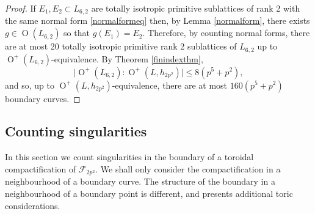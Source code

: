 \documentclass[11pt]{amsart}
\newcommand{\opn}{\operatorname}
\newcommand{\fc}{\mathcal{F}}
\begin{document}
\begin{proof}
If $E_1, E_2 \subset L_{6,2}$ are totally isotropic primitive sublattices of rank 2 with the same normal form \eqref{normalformeq} then, by Lemma \ref{normalform}, there exists $g \in \opn{O}(L_{6,2})$ so that $g(E_1) = E_2$.
Therefore, by counting normal forms, there are at most 20 totally isotropic primitive rank 2 sublattices of $L_{6,2}$ up to $\opn{O}^+(L_{6,2})$-equivalence. 
By Theorem \ref{finindexthm},  
\begin{equation*}
 \vert \opn{O}^+(L_{6,2}) : \opn{O}^+(L, h_{2p^2}) \vert \leq 8 (p^5 + p^2),
\end{equation*} 
and so, up to $\opn{O}^+(L, h_{2p^2})$-equivalence, there are at most $160(p^5 + p^2)$ boundary curves.
\end{proof}
\subsection{Counting singularities}
In this section we count singularities in the boundary of a toroidal compactification of $\fc_{2p^2}$.
We shall only consider the compactification in a neighbourhood of a boundary curve. 
The structure of the boundary in a neighbourhood of a boundary point is different, and presents additional toric considerations.
\end{document}
